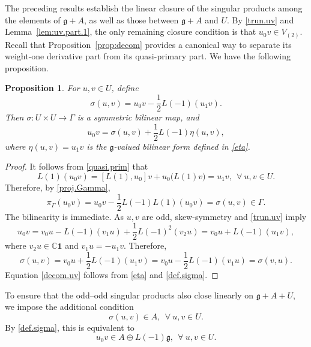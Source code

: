 \documentclass[12pt]{article}
\numberwithin{equation}{section}
\newtheorem{proposition}[theorem]{Proposition}
\theoremstyle{definition}
\theoremstyle{plain}
\newcommand{\bC}{\ensuremath{\mathbb{C}}}
\newcommand{\fg}{\mathfrak{g}}
\newcommand{\bone}{\mathbf{1 }}
\begin{document}
The preceding results establish the linear closure of the singular products among the elements of $\fg+A$, as well as those between $\fg+A$ and $U$. By \eqref{trun.uv} and Lemma~\ref{lem:uv.part.1}, the only remaining closure condition is that $u_0v\in V_{(2)}$. Recall that Proposition~\ref{prop:decom} provides a canonical way to separate its weight-one derivative part from its quasi-primary part. We have the following proposition.

\begin{proposition}\label{prop:sigma}
    For $u,v\in U$, define
    \begin{equation}\label{def.sigma}
        \sigma(u,v)=u_0v-\frac12L(-1)(u_1v).
    \end{equation}
    Then $\sigma:U\times U\rightarrow\Gamma$ is a symmetric bilinear map, and
    \begin{equation}\label{decom.uv}
        u_0v=\sigma(u,v)+\frac12L(-1)\eta(u,v),
    \end{equation}
    where $\eta(u,v)=u_1v$ is the $\fg$-valued bilinear form defined in \eqref{eta}.
\end{proposition}
\begin{proof}
    It follows from \eqref{quasi.prim} that
    \begin{equation*}
        L(1)(u_0v)=[L(1),u_0]v+u_0\big(L(1)v\big)=u_1v,\ \ \forall\ u,v\in U.
    \end{equation*}
    Therefore, by \eqref{proj.Gamma},
    \begin{equation*}
        \pi_\Gamma(u_0v)=u_0v-\frac12L(-1)L(1)(u_0v)=\sigma(u,v)\in\Gamma.
    \end{equation*}
    The bilinearity is immediate. As $u,v$ are odd, skew-symmetry and \eqref{trun.uv} imply
    \begin{equation*}
        u_0v=v_0u-L(-1)(v_1u)+\frac12L(-1)^2(v_2u)=v_0u+L(-1)(u_1v),
    \end{equation*}
    where $v_2u\in\bC\bone$ and $v_1u=-u_1v$. Therefore,
    \begin{equation}\label{symm.sigma}
        \sigma(u,v)=v_0u+\frac12L(-1)(u_1v)=v_0u-\frac12L(-1)(v_1u)=\sigma(v,u).
    \end{equation}
    Equation \eqref{decom.uv} follows from \eqref{eta} and \eqref{def.sigma}.
\end{proof}

To ensure that the odd--odd singular products also close linearly on $\fg+A+U$, we impose the additional condition
\begin{equation}\label{linear.closure}
    \sigma(u,v)\in A,\ \ \forall\ u,v\in U.
\end{equation}
By \eqref{def.sigma}, this is equivalent to
\begin{equation*}
    u_0v\in A\oplus L(-1)\fg,\ \ \forall\ u,v\in U.
\end{equation*}
\end{document}
